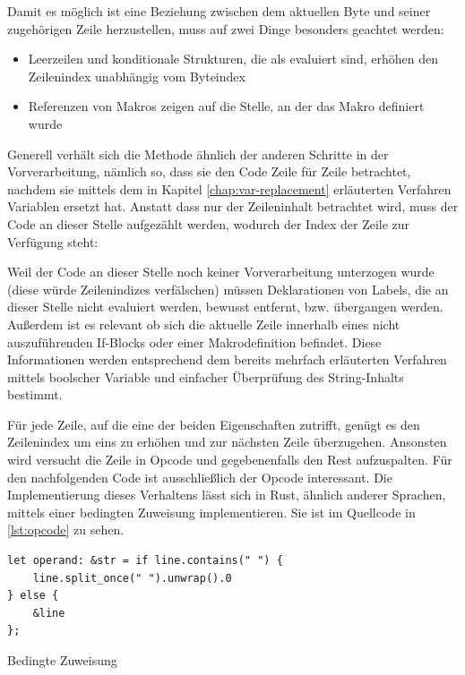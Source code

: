 Damit es möglich ist eine Beziehung zwischen dem aktuellen Byte und seiner zugehörigen Zeile herzustellen, muss auf zwei Dinge besonders geachtet werden:

\begin{itemize}
	\item Leerzeilen und konditionale Strukturen, die als  evaluiert sind, erhöhen den Zeilenindex unabhängig vom Byteindex
	\item Referenzen von Makros zeigen auf die Stelle, an der das Makro definiert wurde
\end{itemize}

Generell verhält sich die Methode ähnlich der anderen Schritte in der Vorverarbeitung, nämlich so, dass sie den Code Zeile für Zeile betrachtet, nachdem sie mittels dem in Kapitel \ref{chap:var-replacement} erläuterten Verfahren Variablen ersetzt hat. Anstatt dass nur der Zeileninhalt betrachtet wird, muss der Code an dieser Stelle aufgezählt werden, wodurch der Index der Zeile zur Verfügung steht:

\qquad{}

Weil der Code an dieser Stelle noch keiner Vorverarbeitung unterzogen wurde (diese würde Zeilenindizes verfälschen) müssen Deklarationen von Labels, die an dieser Stelle nicht evaluiert werden, bewusst entfernt, bzw. übergangen werden. Außerdem ist es relevant ob sich die aktuelle Zeile innerhalb eines nicht auszuführenden If-Blocks oder einer Makrodefinition befindet. Diese Informationen werden entsprechend dem bereits mehrfach erläuterten Verfahren mittels boolscher Variable und einfacher Überprüfung des String-Inhalts bestimmt.

Für jede Zeile, auf die eine der beiden Eigenschaften zutrifft, genügt es den Zeilenindex um eins zu erhöhen und zur nächsten Zeile überzugehen. Ansonsten wird versucht die Zeile in Opcode und gegebenenfalls den Rest aufzuspalten. Für den nachfolgenden Code ist ausschließlich der Opcode interessant. Die Implementierung dieses Verhaltens lässt sich in Rust, ähnlich anderer Sprachen, mittels einer bedingten Zuweisung implementieren. Sie ist im Quellcode in \ref{lst:opcode} zu sehen.

\begin{listing}[th]
\begin{verbatim}
let operand: &str = if line.contains(" ") {
    line.split_once(" ").unwrap().0
} else {
    &line
};
\end{verbatim}
\label{lst:opcode}
\caption{Bedingte Zuweisung}
\end{listing}

